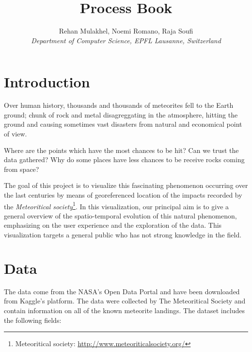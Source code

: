 \documentclass[10pt,conference,compsocconf]{IEEEtran}
\begin{document}
\title{Process Book}

\author{
  Rehan Mulakhel, Noemi Romano, Raja Soufi\\
  \textit{Department of Computer Science, EPFL Lausanne, Switzerland}
}

\maketitle

\section{Introduction}

Over human history, thousands and thousands of meteorites fell to the Earth ground; chunk of rock and metal disagreggating in the atmosphere, hitting the ground and causing sometimes vast disasters from natural and economical point of view.

Where are the points which have the most chances to be hit? Can we trust the data gathered? Why do some places have less chances to be receive rocks coming from space?

The goal of this project is to visualize this fascinating phenomenon occurring over the last centuries by means of georeferenced location of the impacts recorded by the \textit{Meteoritical society}\footnote{Meteoritical society: \href{http://www.meteoriticalsociety.org/}{http://www.meteoriticalsociety.org/}}. In this visualization, our principal aim is to give a general overview of the spatio-temporal evolution of this natural phenomenon, emphasizing on the user experience and the exploration of the data. This visualization targets a general public who has not strong knowledge in the field.


\section{Data}
\label{sec:data}
The data come from the NASA’s Open Data Portal and have been downloaded from Kaggle’s platform. The data were collected by The Meteoritical Society and contain information on all of the known meteorite landings. The dataset includes the following fields:
\end{document}
